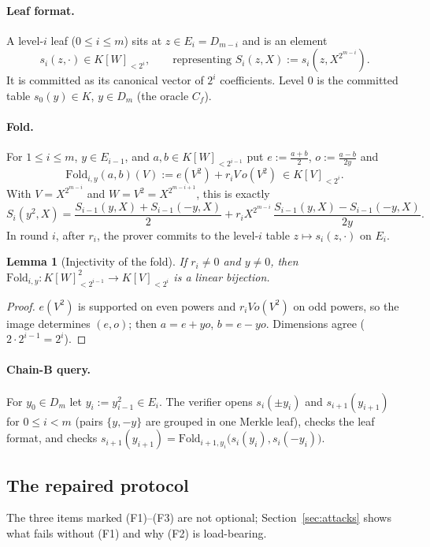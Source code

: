 \documentclass[11pt]{article}
\newtheorem{lemma}[theorem]{Lemma}
\theoremstyle{definition}
\newcommand{\K}{K}
\newcommand{\Fold}{\mathrm{Fold}}
\begin{document}
\paragraph{Leaf format.} A level-$i$ leaf ($0\le i\le m$) sits at $z\in E_i=D_{m-i}$ and is an element
\[
s_i(z,\cdot)\in\K[W]_{<2^i},\qquad\text{representing } S_i(z,X):=s_i(z,X^{2^{m-i}}).
\]
It is committed as its canonical vector of $2^i$ coefficients. Level $0$ is the committed table $s_0(y)\in\K$, $y\in D_m$ (the oracle $C_f$).

\paragraph{Fold.} For $1\le i\le m$, $y\in E_{i-1}$, and $a,b\in\K[W]_{<2^{i-1}}$ put $e:=\frac{a+b}2$, $o:=\frac{a-b}{2y}$ and
\[
\Fold_{i,y}(a,b)(V):=e(V^2)+r_iV\,o(V^2)\ \in\K[V]_{<2^i}.
\]
With $V=X^{2^{m-i}}$ and $W=V^2=X^{2^{m-i+1}}$, this is exactly
\[
S_i(y^2,X)=\frac{S_{i-1}(y,X)+S_{i-1}(-y,X)}2+r_iX^{2^{m-i}}\,\frac{S_{i-1}(y,X)-S_{i-1}(-y,X)}{2y}.
\]
In round $i$, after $r_i$, the prover commits to the level-$i$ table $z\mapsto s_i(z,\cdot)$ on $E_i$.

\begin{lemma}[Injectivity of the fold]\label{lem:inj}
If $r_i\ne0$ and $y\ne0$, then $\Fold_{i,y}:\K[W]_{<2^{i-1}}^2\to\K[V]_{<2^i}$ is a linear bijection.
\end{lemma}
\begin{proof}
$e(V^2)$ is supported on even powers and $r_iVo(V^2)$ on odd powers, so the image determines $(e,o)$; then $a=e+yo$, $b=e-yo$. Dimensions agree ($2\cdot2^{i-1}=2^i$).
\end{proof}

\paragraph{Chain-B query.} For $y_0\in D_m$ let $y_{i}:=y_{i-1}^2\in E_i$. The verifier opens $s_{i}(\pm y_{i})$ and $s_{i+1}(y_{i+1})$ for $0\le i<m$ (pairs $\{y,-y\}$ are grouped in one Merkle leaf), checks the leaf format, and checks $s_{i+1}(y_{i+1})=\Fold_{i+1,y_i}\big(s_i(y_i),s_i(-y_i)\big)$.

\subsection{The repaired protocol}

The three items marked (F1)--(F3) are not optional; Section~\ref{sec:attacks} shows what fails without (F1) and why (F2) is load-bearing.
\end{document}
